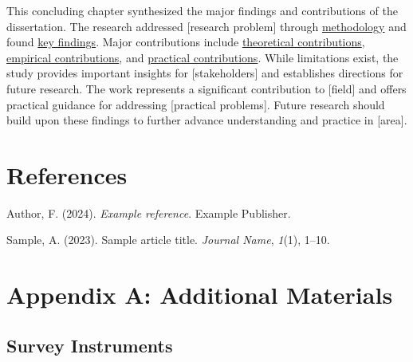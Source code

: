 \documentclass[
  12pt,
  letterpaper,
  12pt,
  letterpaper,
  oneside]{report}
\newlength{\cslhangindent}
\newenvironment{CSLReferences}[2] %
 {\begin{list}{}{%
  \setlength{\itemindent}{0pt}
  \setlength{\leftmargin}{0pt}
  \setlength{\parsep}{0pt}
  \ifodd #1
   \setlength{\leftmargin}{\cslhangindent}
   \setlength{\itemindent}{-1\cslhangindent}
  \fi
  \setlength{\itemsep}{#2\baselineskip}}}
 {\end{list}}
\begin{document}
This concluding chapter synthesized the major findings and contributions
of the dissertation. The research addressed {[}research problem{]}
through \hyperref[methodology]{methodology} and found
\hyperref[key-findings]{key findings}. Major contributions include
\hyperref[theoretical-contributions]{theoretical contributions},
\hyperref[empirical-contributions]{empirical contributions}, and
\hyperref[practical-contributions]{practical contributions}. While
limitations exist, the study provides important insights for
{[}stakeholders{]} and establishes directions for future research. The
work represents a significant contribution to {[}field{]} and offers
practical guidance for addressing {[}practical problems{]}. Future
research should build upon these findings to further advance
understanding and practice in {[}area{]}.


\chapter*{References}\label{references}


\label{refs}
\begin{CSLReferences}{1}{0}
Author, F. (2024). \emph{Example reference}. Example Publisher.

Sample, A. (2023). Sample article title. \emph{Journal Name},
\emph{1}(1), 1--10.

\end{CSLReferences}

\cleardoublepage
{}
{}
\appendix

\chapter*{Appendix A: Additional
Materials}\label{appendix-a-additional-materials}


\section*{Survey Instruments}\label{survey-instruments}
\end{document}
